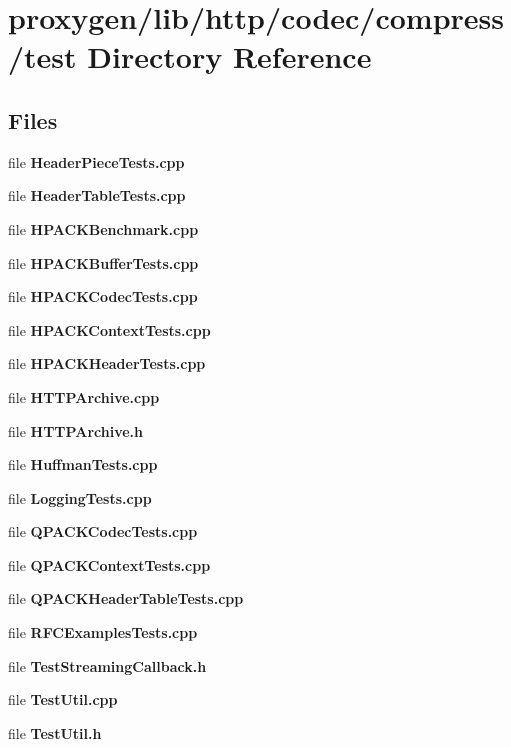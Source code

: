 \section{proxygen/lib/http/codec/compress/test Directory Reference}
\label{dir_e9ccde7b77ec06f2d401d4861c153096}
\subsection*{Files}
\begin{DoxyCompactItemize}
\item 
file {\bf Header\+Piece\+Tests.\+cpp}
\item 
file {\bf Header\+Table\+Tests.\+cpp}
\item 
file {\bf H\+P\+A\+C\+K\+Benchmark.\+cpp}
\item 
file {\bf H\+P\+A\+C\+K\+Buffer\+Tests.\+cpp}
\item 
file {\bf H\+P\+A\+C\+K\+Codec\+Tests.\+cpp}
\item 
file {\bf H\+P\+A\+C\+K\+Context\+Tests.\+cpp}
\item 
file {\bf H\+P\+A\+C\+K\+Header\+Tests.\+cpp}
\item 
file {\bf H\+T\+T\+P\+Archive.\+cpp}
\item 
file {\bf H\+T\+T\+P\+Archive.\+h}
\item 
file {\bf Huffman\+Tests.\+cpp}
\item 
file {\bf Logging\+Tests.\+cpp}
\item 
file {\bf Q\+P\+A\+C\+K\+Codec\+Tests.\+cpp}
\item 
file {\bf Q\+P\+A\+C\+K\+Context\+Tests.\+cpp}
\item 
file {\bf Q\+P\+A\+C\+K\+Header\+Table\+Tests.\+cpp}
\item 
file {\bf R\+F\+C\+Examples\+Tests.\+cpp}
\item 
file {\bf Test\+Streaming\+Callback.\+h}
\item 
file {\bf Test\+Util.\+cpp}
\item 
file {\bf Test\+Util.\+h}
\end{DoxyCompactItemize}
